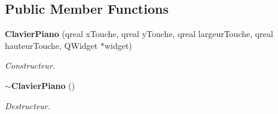 \subsection*{Public Member Functions}
\begin{DoxyCompactItemize}
\item 
{\bf Clavier\-Piano} (qreal x\-Touche, qreal y\-Touche, qreal largeur\-Touche, qreal hauteur\-Touche, Q\-Widget $\ast$widget)
\begin{DoxyCompactList}\small\item\em Constructeur. \end{DoxyCompactList}\item 
{\bf $\sim$\-Clavier\-Piano} ()\label{class_clavier_piano_a33d1d8bec0d7d48f009440d40b4302c0}

\begin{DoxyCompactList}\small\item\em Destructeur. \end{DoxyCompactList}\end{DoxyCompactItemize}
